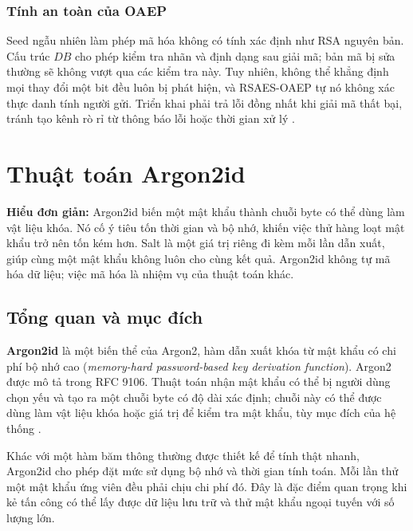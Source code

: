 \subsubsection{Tính an toàn của OAEP}
Seed ngẫu nhiên làm phép mã hóa không có tính xác định như RSA nguyên bản. Cấu trúc $DB$ cho phép kiểm tra nhãn và định dạng sau giải mã; bản mã bị sửa thường sẽ không vượt qua các kiểm tra này. Tuy nhiên, không thể khẳng định mọi thay đổi một bit đều luôn bị phát hiện, và RSAES-OAEP tự nó không xác thực danh tính người gửi. Triển khai phải trả lỗi đồng nhất khi giải mã thất bại, tránh tạo kênh rò rỉ từ thông báo lỗi hoặc thời gian xử lý \cite{rsa8017}.



\section{Thuật toán Argon2id}

\noindent\textbf{Hiểu đơn giản:} Argon2id biến một mật khẩu thành chuỗi byte có thể dùng làm vật liệu khóa. Nó cố ý tiêu tốn thời gian và bộ nhớ, khiến việc thử hàng loạt mật khẩu trở nên tốn kém hơn. Salt là một giá trị riêng đi kèm mỗi lần dẫn xuất, giúp cùng một mật khẩu không luôn cho cùng kết quả. Argon2id không tự mã hóa dữ liệu; việc mã hóa là nhiệm vụ của thuật toán khác.

\subsection{Tổng quan và mục đích}
\textbf{Argon2id} là một biến thể của Argon2, hàm dẫn xuất khóa từ mật khẩu có chi phí bộ nhớ cao (\textit{memory-hard password-based key derivation function}). Argon2 được mô tả trong RFC 9106. Thuật toán nhận mật khẩu có thể bị người dùng chọn yếu và tạo ra một chuỗi byte có độ dài xác định; chuỗi này có thể được dùng làm vật liệu khóa hoặc giá trị để kiểm tra mật khẩu, tùy mục đích của hệ thống \cite{argon2rfc}.

Khác với một hàm băm thông thường được thiết kế để tính thật nhanh, Argon2id cho phép đặt mức sử dụng bộ nhớ và thời gian tính toán. Mỗi lần thử một mật khẩu ứng viên đều phải chịu chi phí đó. Đây là đặc điểm quan trọng khi kẻ tấn công có thể lấy được dữ liệu lưu trữ và thử mật khẩu ngoại tuyến với số lượng lớn.

